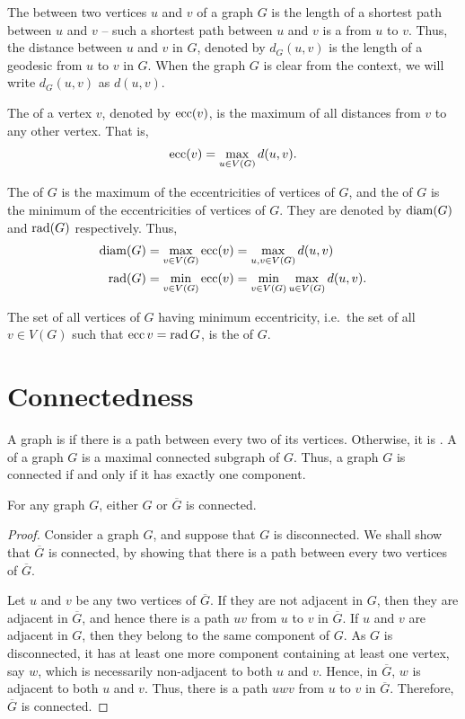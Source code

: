 The  between two vertices $u$ and $v$ of a graph $G$ is the length of a shortest path between $u$ and $v$ -- such a shortest path between $u$ and $v$ is a  from $u$ to $v$. Thus, the distance between $u$ and $v$ in $G$, denoted by $d_G(u, v)$ is the length of a geodesic from $u$ to $v$ in $G$. When the graph $G$ is clear from the context, we will write $d_G(u, v)$ as $d(u, v)$.

The  of a vertex $v$, denoted by $\operatorname{ecc}(v)$, is the maximum of all distances from $v$ to any other vertex. That is,
\begin{equation*}
    \operatorname{ecc}(v) = \max_{u \in V(G)} d(u, v) .
\end{equation*}

The  of $G$ is the maximum of the eccentricities of vertices of $G$, and the  of $G$ is the minimum of the eccentricities of vertices of $G$. They are denoted by $\operatorname{diam}(G)$ and $\operatorname{rad}(G)$ respectively. Thus,
\begin{align*}
    \operatorname{diam}(G) & = \max_{v \in V(G)} \operatorname{ecc}(v)= \max_{u, v \in V(G)} d(u, v) \\
    \operatorname{rad}(G) & = \min_{v \in V(G)}\operatorname{ecc}(v) = \min_{v \in V(G)} \max_{u \in V(G)} d(u, v).
\end{align*}

The set of all vertices of $G$ having minimum eccentricity, i.e.\ the set of all $v \in V(G)$ such that $\operatorname{ecc} v = \operatorname{rad} G$, is the  of $G$.


\section{Connectedness}\label{sec:Connectedness}

A graph is  if there is a path between every two of its vertices. Otherwise, it is . A  of a graph $G$ is a maximal connected subgraph of $G$. Thus, a graph $G$ is connected if and only if it has exactly one component.

\begin{Theorem}\label{thm:GorGCompConn}
For any graph $G$, either $G$ or $\overline G$ is connected.
\end{Theorem}

\begin{proof}
Consider a graph $G$, and suppose that $G$ is disconnected. We shall show that $\overline G$ is connected, by showing that there is a path between every two vertices of $\overline G$.

Let $u$ and $v$ be any two vertices of $\overline G$. If they are not adjacent in $G$, then they are adjacent in $\overline G$, and hence there is a path $uv$ from $u$ to $v$ in $\overline G$. If $u$ and $v$ are adjacent in $G$, then they belong to the same component of $G$. As $G$ is disconnected, it has at least one more component containing at least one vertex, say $w$, which is necessarily non-adjacent to both $u$ and $v$. Hence, in $\overline G$, $w$ is adjacent to both $u$ and $v$. Thus, there is a path $uwv$ from $u$ to $v$ in $\overline G$. Therefore, $\overline G$ is connected.
\end{proof}

